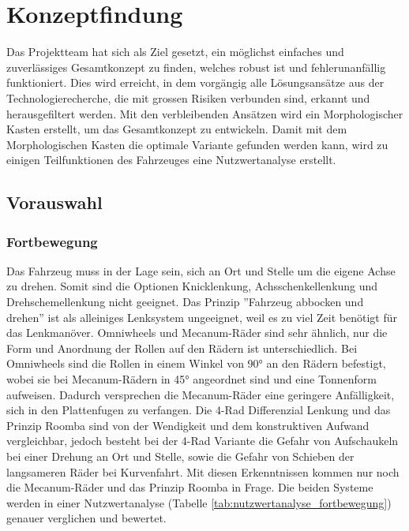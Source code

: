 \documentclass[../main.tex]{subfiles}
\begin{document}
\newpage
\section{Konzeptfindung}
\label{a3:Konzeptfindung}

Das Projektteam hat sich als Ziel gesetzt, ein möglichst einfaches und zuverlässiges Gesamtkonzept zu finden, welches robust ist und fehlerunanfällig funktioniert. Dies wird erreicht, in dem vorgängig alle Lösungsansätze aus der Technologierecherche, die mit grossen Risiken verbunden sind, erkannt und herausgefiltert werden. Mit den verbleibenden Ansätzen wird ein Morphologischer Kasten erstellt, um das Gesamtkonzept zu entwickeln. Damit mit dem Morphologischen Kasten die optimale Variante gefunden werden kann, wird zu einigen Teilfunktionen des Fahrzeuges eine Nutzwertanalyse erstellt.

\subsection{Vorauswahl}
\label{a3:Vorauswahl}
    \subsubsection{Fortbewegung}
    Das Fahrzeug muss in der Lage sein, sich an Ort und Stelle um die eigene Achse zu drehen. Somit sind die Optionen Knicklenkung, Achsschenkellenkung und Drehschemellenkung nicht geeignet.
    Das Prinzip ''Fahrzeug abbocken und drehen'' ist als alleiniges Lenksystem ungeeignet, weil es zu viel Zeit benötigt für das Lenkmanöver. 
    Omniwheels und Mecanum-Räder sind sehr ähnlich, nur die Form und Anordnung der Rollen auf den Rädern ist unterschiedlich. Bei Omniwheels sind die Rollen in einem Winkel von 90° an den Rädern befestigt, wobei sie bei Mecanum-Rädern in 45° angeordnet sind und eine Tonnenform aufweisen. Dadurch versprechen die Mecanum-Räder eine geringere Anfälligkeit, sich in den Plattenfugen zu verfangen. Die 4-Rad Differenzial Lenkung und das Prinzip Roomba sind von der Wendigkeit und dem konstruktiven Aufwand vergleichbar, jedoch besteht bei der 4-Rad Variante die Gefahr von Aufschaukeln bei einer Drehung an Ort und Stelle, sowie die Gefahr von Schieben der langsameren Räder bei Kurvenfahrt. Mit diesen Erkenntnissen kommen nur noch die Mecanum-Räder und das Prinzip Roomba in Frage. Die beiden Systeme werden in einer Nutzwertanalyse (Tabelle \ref{tab:nutzwertanalyse_fortbewegung}) genauer verglichen und bewertet.
        
\newpage
\end{document}
